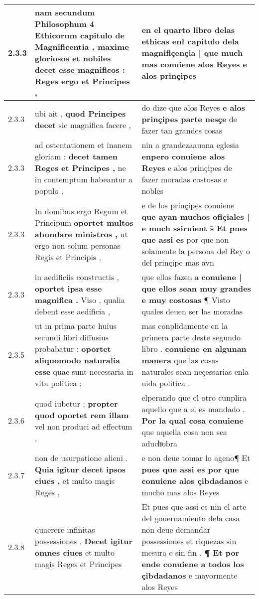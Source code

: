 \begin{tabular}{|p{1cm}|p{6.5cm}|p{6.5cm}|}
2.3.3 & nam secundum Philosophum 4 Ethicorum capitulo de Magnificentia , \textbf{ maxime gloriosos et nobiles decet esse magnificos : } Reges ergo et Principes , & en el quarto libro delas ethicas \textbf{ enł capitulo dela magnifiçençia | que much mas conuiene alos Reyes } e alos prinçipes \\\hline
2.3.3 & ubi ait , \textbf{ quod Principes decet } sic magnifica facere , & do dize que alos Reyes \textbf{ e alos prinçipes parte nesçe } de fazer tan grandes cosas \\\hline
2.3.3 & ad ostentationem et inanem gloriam : \textbf{ decet tamen Reges et Principes , } ne in contemptum habeantur a populo , & nin a grandezaauana eglesia \textbf{ enpero conuiene alos Reyes } e alos prinçipes de fazer moradas costosas e nobles \\\hline
2.3.3 & In domibus ergo Regum et Principum \textbf{ oportet multos abundare ministros , } ut ergo non solum personas Regis et Principis , & e de los prinçipes conuiene \textbf{ que ayan muchos ofiçiales | e much ssiruient s̃ Et pues que assi es } por que non solamente la persona del Rey o del prinçipe mas avn \\\hline
2.3.3 & in aedificiis constructis , \textbf{ oportet ipsa esse magnifica . } Viso , qualia debent esse aedificia , & que ellos fazen a \textbf{ conuiene | que ellos sean muy grandes e muy costosas } ¶ Visto quales deuen ser las moradas \\\hline
2.3.5 & ut in prima parte huius secundi libri diffusius probabatur : \textbf{ oportet aliquomodo naturalia esse } quae sunt necessaria in vita politica ; & mas conplidamente en la primera parte deste segundo libro . \textbf{ conuiene en algunan manera } que las cosas naturales sean neçessarias enla uida politica . \\\hline
2.3.6 & quod iubetur ; \textbf{ propter quod oportet rem illam } vel non produci ad effectum , & elperando que el otro cunplira aquello que a el es mandado . \textbf{ Por la qual cosa conuiene } que aquella cosa non sea aduchͣobra \\\hline
2.3.7 & non de usurpatione alieni . \textbf{ Quia igitur decet ipsos ciues , } et multo magis Reges , & e non deue tomar lo ageno¶ Et \textbf{ pues que assi es por que conuiene alos çibdadanos } e mucho mas alos Reyes \\\hline
2.3.8 & quaerere infinitas possessiones . \textbf{ Decet igitur omnes ciues } et multo magis Reges et Principes & Et pues que assi es nin el arte del gouernamiento dela casa non deue demandar possessiones et riquezas sin mesura e sin fin . \textbf{ ¶ Et por ende conuiene a todos los çibdadanos } e mayormente alos Reyes \\\hline

\end{tabular}
